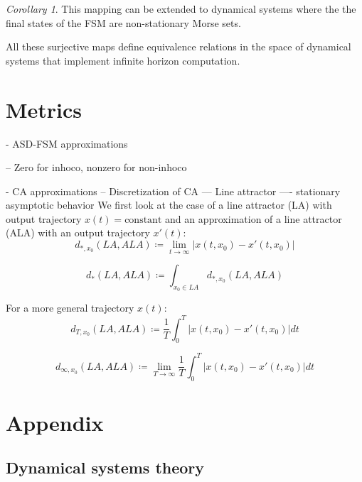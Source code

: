 \documentclass{scrartcl}
\theoremstyle{definition}
\theoremstyle{remark}
\newtheorem{corollary}[theorem]{Corollary}
\begin{document}
\begin{corollary}
This mapping can be extended to dynamical systems where the  the final states of the FSM are non-stationary Morse sets.
\end{corollary}

All these surjective maps define equivalence relations in the space of dynamical systems that implement infinite horizon computation.


\section{Metrics}

- ASD-FSM approximations

-- Zero for inhoco, nonzero for non-inhoco




- CA approximations 
-- Discretization of CA
--- Line attractor
---- stationary asymptotic behavior
We first look at the case of a line attractor (LA) with output trajectory $x(t)=\text{constant}$ and an approximation of a line attractor (ALA) with an output trajectory $x'(t)$:
\begin{equation}
d_{*,x_0}(LA, ALA) \coloneqq\lim_{t\rightarrow\infty} |x(t, x_0) - x'(t, x_0)|
\end{equation}

\begin{equation}
d_{*}(LA, ALA) \coloneqq \int_{x_0\in LA} d_{*,x_0}(LA, ALA)
\end{equation}



For a more general trajectory $x(t)$:
\begin{equation}
d_{T,x_0}(LA, ALA) \coloneqq \frac{1}{T} \int_0^T   |x(t, x_0) - x'(t, x_0)| dt
\end{equation}

\begin{equation}
d_{\infty,x_0}(LA, ALA) \coloneqq \lim_{T\rightarrow\infty} \frac{1}{T} \int_0^T   |x(t, x_0) - x'(t, x_0)| dt
\end{equation}






\section{Appendix}
\subsection{Dynamical systems theory}\label{sec:dst}
\end{document}
